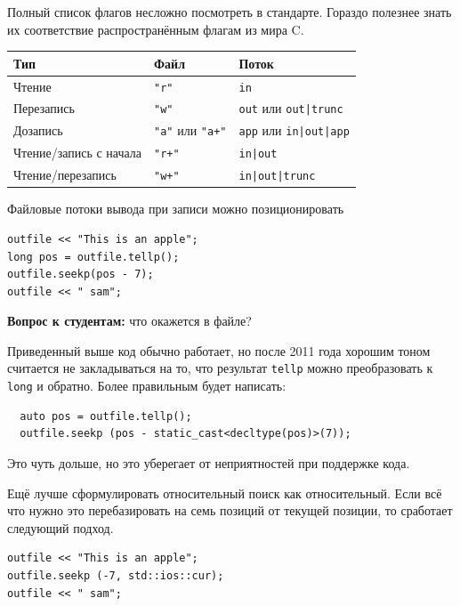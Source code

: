 \documentclass[a4paper,12pt,oneside]{book}
\newif\ifanswers
\begin{document}
Полный список флагов несложно посмотреть в стандарте. Гораздо полезнее знать их соответствие распространённым флагам из мира C.

\begin{center}
\begin{tabular}{ | l | l | l | }
  \hline
  Тип & Файл & Поток \\ \hline
  Чтение & \lstinline!"r"! & \lstinline!in! \\
  Перезапись & \lstinline!"w"! & \lstinline!out! или \lstinline!out|trunc! \\
  Дозапись & \lstinline!"a"! или \lstinline!"a+"! & \lstinline!app! или \lstinline!in|out|app! \\
  Чтение/запись с начала & \lstinline!"r+"! & \lstinline!in|out! \\
  Чтение/перезапись & \lstinline!"w+"! & \lstinline!in|out|trunc! \\
  \hline
\end{tabular}
\end{center}

Файловые потоки вывода при записи можно позиционировать

\begin{lstlisting}
outfile << "This is an apple";
long pos = outfile.tellp();
outfile.seekp(pos - 7);
outfile << " sam";
\end{lstlisting}

\textbf{Вопрос к студентам:} что окажется в файле?

\ifanswers
Правильный ответ: this is a sample
\fi

Приведенный выше код обычно работает, но после 2011 года хорошим тоном считается не закладываться на то, что результат \lstinline!tellp! можно преобразовать к \lstinline!long! и обратно. Более правильным будет написать:

\begin{lstlisting}
  auto pos = outfile.tellp();
  outfile.seekp (pos - static_cast<decltype(pos)>(7));
\end{lstlisting}

Это чуть дольше, но это уберегает от неприятностей при поддержке кода.

Ещё лучше сформулировать относительный поиск как относительный. Если всё что нужно это перебазировать на семь позиций от текущей позиции, то сработает следующий подход.

\begin{lstlisting}
outfile << "This is an apple";
outfile.seekp (-7, std::ios::cur);
outfile << " sam";
\end{lstlisting}
\end{document}
